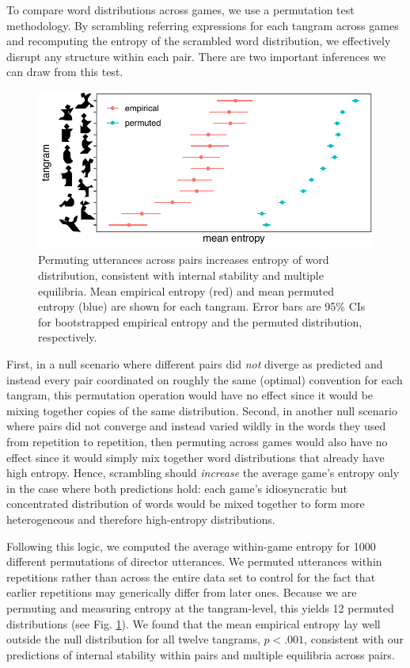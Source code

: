 \documentclass[alpha-refs]{wiley-article}
\begin{document}
To compare word distributions across games, we use a permutation test methodology.
By scrambling referring expressions for each tangram across games and recomputing the entropy of the scrambled word distribution, we effectively disrupt any structure within each pair.
There are two important inferences we can draw from this test.
\begin{figure}[t!]
\centering
\includegraphics[scale=.9]{permutedDiscrete.pdf}
\caption{Permuting utterances across pairs increases entropy of word distribution, consistent with internal stability and multiple equilibria. Mean empirical entropy (red) and mean permuted entropy (blue) are shown for each tangram. Error bars are 95\% CIs for bootstrapped empirical entropy and the permuted distribution, respectively.}
\label{fig:permuted}
\end{figure}
First, in a null scenario where different pairs did \emph{not} diverge as predicted and instead every pair coordinated on roughly the same (optimal) convention for each tangram, this permutation operation would have no effect since it would be mixing together copies of the same distribution.
Second, in another null scenario where pairs did not converge and instead varied wildly in the words they used from repetition to repetition, then permuting across games would also have no effect since it would simply mix together word distributions that already have high entropy.
Hence, scrambling should \emph{increase} the average game's entropy only in the case where both predictions hold: each game's idiosyncratic but concentrated distribution of words would be mixed together to form more heterogeneous and therefore high-entropy distributions.

Following this logic, we computed the average within-game entropy for 1000 different permutations of director utterances. 
We permuted utterances within repetitions rather than across the entire data set to control for the fact that earlier repetitions may generically differ from later ones. 
Because we are permuting and measuring entropy at the tangram-level, this yields 12 permuted distributions (see Fig. \ref{fig:permuted}).
We found that the mean empirical entropy lay well outside the null distribution for all twelve tangrams, $p < .001$, consistent with our predictions of internal stability within pairs and multiple equilibria across pairs.
\end{document}
